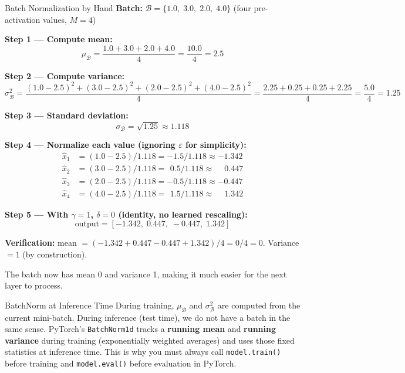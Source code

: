 \begin{examplebox}{Batch Normalization by Hand}
\textbf{Batch:} $\mathcal{B} = \{1.0,\; 3.0,\; 2.0,\; 4.0\}$ (four pre-activation values, $M = 4$)

\textbf{Step 1 --- Compute mean:}
\[
    \mu_\mathcal{B} = \frac{1.0 + 3.0 + 2.0 + 4.0}{4} = \frac{10.0}{4} = 2.5
\]

\textbf{Step 2 --- Compute variance:}
\[
    \sigma^2_\mathcal{B} = \frac{(1.0-2.5)^2 + (3.0-2.5)^2 + (2.0-2.5)^2 + (4.0-2.5)^2}{4}
    = \frac{2.25 + 0.25 + 0.25 + 2.25}{4} = \frac{5.0}{4} = 1.25
\]

\textbf{Step 3 --- Standard deviation:}
\[
    \sigma_\mathcal{B} = \sqrt{1.25} \approx 1.118
\]

\textbf{Step 4 --- Normalize each value (ignoring $\varepsilon$ for simplicity):}
\begin{align*}
    \hat{x}_1 &= (1.0 - 2.5) / 1.118 = -1.5 / 1.118 \approx -1.342 \\
    \hat{x}_2 &= (3.0 - 2.5) / 1.118 = \ \, 0.5 / 1.118 \approx \phantom{-}0.447 \\
    \hat{x}_3 &= (2.0 - 2.5) / 1.118 = -0.5 / 1.118 \approx -0.447 \\
    \hat{x}_4 &= (4.0 - 2.5) / 1.118 = \ \, 1.5 / 1.118 \approx \phantom{-}1.342
\end{align*}

\textbf{Step 5 --- With $\gamma = 1$, $\delta = 0$ (identity, no learned rescaling):}
\[
    \text{output} = [-1.342,\; 0.447,\; -0.447,\; 1.342]
\]

\textbf{Verification:} mean $= (-1.342 + 0.447 - 0.447 + 1.342)/4 = 0/4 = 0$. Variance $= 1$ (by construction).

The batch now has mean 0 and variance 1, making it much easier for the next layer to process.
\end{examplebox}

\begin{keyinsight}{BatchNorm at Inference Time}
During training, $\mu_\mathcal{B}$ and $\sigma^2_\mathcal{B}$ are computed from the current mini-batch. During inference (test time), we do not have a batch in the same sense. PyTorch's \texttt{BatchNorm1d} tracks a \textbf{running mean} and \textbf{running variance} during training (exponentially weighted averages) and uses those fixed statistics at inference time. This is why you must always call \texttt{model.train()} before training and \texttt{model.eval()} before evaluation in PyTorch.
\end{keyinsight}

